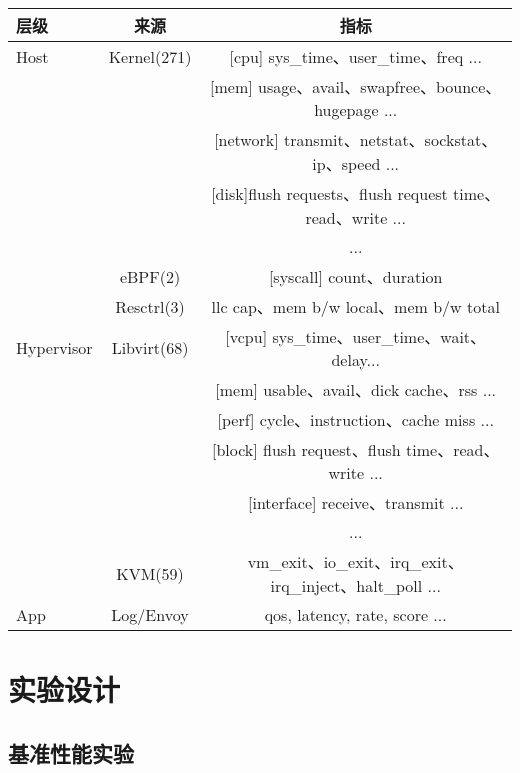 \begin{table}
    \label{tab:metric_list}
    \footnotesize%
    \setlength{\tabcolsep}{4pt}%
    \renewcommand{\arraystretch}{1.5}%
    \centering
    \begin{tabular}{lcc}
        \hline
        层级 & 来源 & 指标\\
        \hline
        Host & Kernel(271) & [cpu] sys\_time、user\_time、freq ... \\
        & & [mem] usage、avail、swapfree、bounce、hugepage ...\\
        & & [network] transmit、netstat、sockstat、ip、speed ...\\
        & & [disk]flush requests、flush request time、read、write ...\\
        & & ...\\
        & eBPF(2) & [syscall] count、duration\\
        & Resctrl(3) & llc cap、mem b/w local、mem b/w total\\
        Hypervisor & Libvirt(68) & [vcpu] sys\_time、user\_time、wait、delay...\\
        & & [mem] usable、avail、dick cache、rss ...\\
        & & [perf] cycle、instruction、cache miss ...\\
        & & [block] flush request、flush time、read、write ...\\
        & & [interface] receive、transmit ...\\
        & & ...\\
        & KVM(59) & vm\_exit、io\_exit、irq\_exit、irq\_inject、halt\_poll ...\\
        App & Log/Envoy & qos, latency, rate, score ...\\
        \hline
    \end{tabular}
\end{table}

\section{实验设计}

\subsection{基准性能实验}

